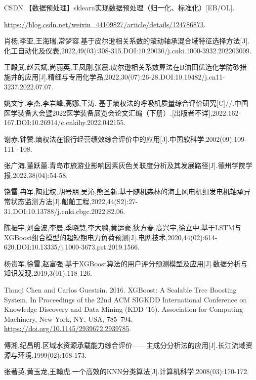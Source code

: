 \documentclass{MathorCupmodeling}
\begin{document}
	\newpage
	\begin{spacing}{1.08}
	\begin{thebibliography}{99}
	CSDN.【数据预处理】sklearn实现数据预处理（归一化、标准化）[EB/OL].
	
	\url{https://blog.csdn.net/weixin_44109827/article/details/124786873}.

	肖杨,李亚,王海瑞,常梦容.基于皮尔逊相关系数的滚动轴承混合域特征选择方法[J].化工自动化及仪表,2022,49(03):308-315.DOI:10.20030/j.cnki.1000-3932.202203009.
	
	王殿武,赵云斌,尚丽英,王凤刚,张震.皮尔逊相关系数算法在B油田优选化学防砂措施井的应用[J].精细与专用化学品,2022,30(07):26-28.DOI:10.19482/j.cn11-3237.2022.07.07.

	姚文宇,李杰,李岩峰,高娜,王涛. 基于熵权法的呼吸机质量综合评价研究[C]//.中国医学装备大会暨2022医学装备展览会论文汇编（下册）.[出版者不详],2022:162-167.DOI:10.26914/c.cnkihy.2022.042155.

	谢赤,钟赞.熵权法在银行经营绩效综合评价中的应用[J].中国软科学,2002(09):109-111+108.

	张广海,董跃蕾.青岛市旅游业影响因素灰色关联度分析及其发展路径[J].德州学院学报,2022,38(04):54-58.

	饶雷,冉军,陶建权,胡号朋,吴沁,熊圣新.基于随机森林的海上风电机组发电机轴承异常状态监测方法[J].船舶工程,2022,44(S2):27-31.DOI:10.13788/j.cnki.cbgc.2022.S2.06.

	陈振宇,刘金波,李晨,季晓慧,李大鹏,黄运豪,狄方春,高兴宇,徐立中.基于LSTM与XGBoost组合模型的超短期电力负荷预测[J].电网技术,2020,44(02):614-620.DOI:10.13335/j.1000-3673.pst.2019.1566.

	杨贵军,徐雪,赵富强.基于XGBoost算法的用户评分预测模型及应用[J].数据分析与知识发现,2019,3(01):118-126.

	Tianqi Chen and Carlos Guestrin. 2016. XGBoost: A Scalable Tree Boosting System. In Proceedings of the 22nd ACM SIGKDD International Conference on Knowledge Discovery and Data Mining (KDD '16). Association for Computing Machinery, New York, NY, USA, 785–794. \url{https://doi.org/10.1145/2939672.2939785}.

	傅湘,纪昌明.区域水资源承载能力综合评价——主成分分析法的应用[J].长江流域资源与环境,1999(02):168-173.

	张著英,黄玉龙,王翰虎.一个高效的KNN分类算法[J].计算机科学,2008(03):170-172.


\end{thebibliography}
\end{spacing}
\end{document}
